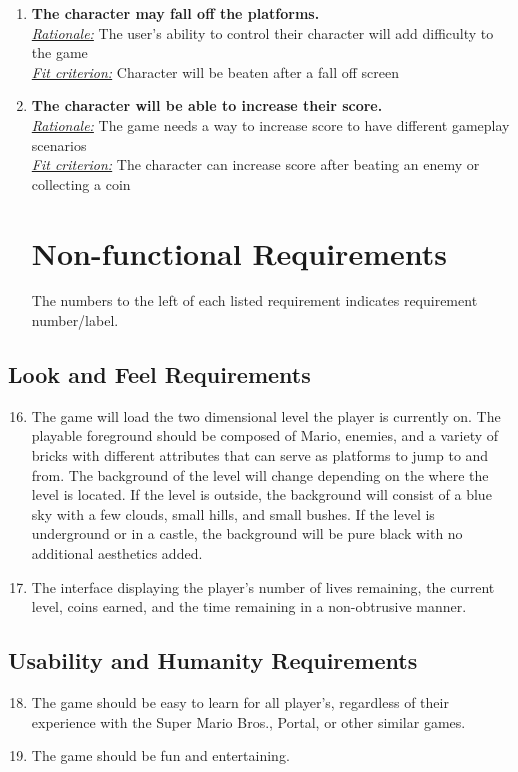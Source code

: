 \documentclass[12pt, titlepage]{article}
\begin{document}
\begin{enumerate}
\item \textbf{The character may fall off the platforms.} \\
\underline{\textit{Rationale:}} The user's ability to control their character will add difficulty to the game\\
\underline{\textit{Fit criterion:}} Character will be beaten after a fall off screen\\

\item \textbf{The character will be able to increase their score.} \\
\underline{\textit{Rationale:}} The game needs a way to increase score to have different gameplay scenarios\\
\underline{\textit{Fit criterion:}} The character can increase score after beating an enemy or collecting a coin\\
\section{Non-functional Requirements}
The numbers to the left of each listed requirement indicates requirement number/label.
\end{enumerate}

\subsection{Look and Feel Requirements}
\begin{enumerate}
\setcounter{enumi}{15}
	\item The game will load the two dimensional level the player is currently on. The playable foreground should be composed of Mario, enemies, and a variety of bricks with different attributes that can serve as platforms to jump to and from. The background of the level will change depending on the where the level is located. If the level is outside, the background will consist of a blue sky with a few clouds, small hills, and small bushes. If the level is underground or in a castle, the background will be pure black with no additional aesthetics added.
	\item The interface displaying the player's number of lives remaining, the current level, coins earned, and the time remaining in a non-obtrusive manner.
\end{enumerate}

\subsection{Usability and Humanity Requirements}
\begin{enumerate}
\setcounter{enumi}{17}
	\item The game should be easy to learn for all player's, regardless of their experience with the Super Mario Bros., Portal, or other similar games.
	\item The game should be fun and entertaining.
\end{enumerate}
\end{document}

